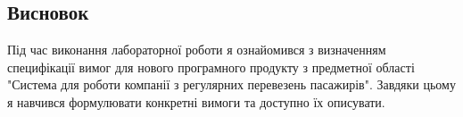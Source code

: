 \documentclass[14pt]{extreport}
\begin{document}
\begin{normalsize}
	\section*{Висновок}
	Під час виконання лабораторної роботи я ознайомився з визначенням специфікації вимог для
	нового програмного продукту з предметної області "Система для роботи компанії з регулярних перевезень пасажирів". Завдяки цьому я навчився формулювати конкретні вимоги та доступно їх
	описувати.
	
\end{normalsize}
\end{document}
